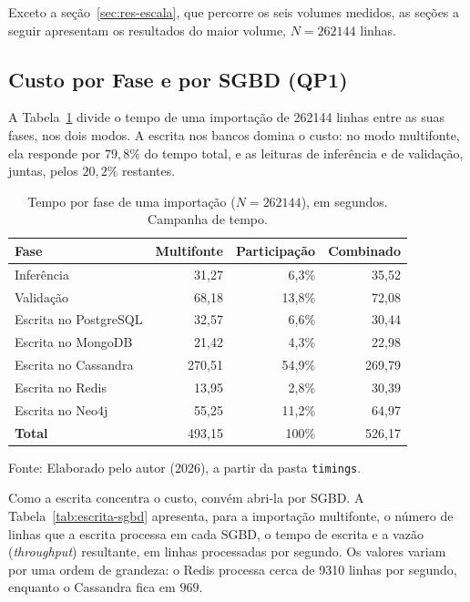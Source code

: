 Exceto a seção~\ref{sec:res-escala}, que percorre os seis volumes medidos, as seções a seguir
apresentam os resultados do maior volume, $N = \num{262144}$ linhas.

\subsection{Custo por Fase e por SGBD (QP1)}
\label{sec:res-fases}

A Tabela~\ref{tab:fases} divide o tempo de uma importação de \num{262144} linhas entre as
suas fases, nos dois modos. A escrita nos bancos domina o custo: no modo multifonte, ela
responde por $79{,}8\%$ do tempo total, e as leituras de inferência e de validação, juntas,
pelos $20{,}2\%$ restantes.

\begin{table}[H]
  \caption{Tempo por fase de uma importação ($N = \num{262144}$), em segundos. Campanha de tempo.}
  \label{tab:fases}
  \centering
  \begin{tabular}{l r r r}
    \toprule
    \textbf{Fase} & \textbf{Multifonte} & \textbf{Participação} & \textbf{Combinado} \\
    \midrule
    Inferência             &  31{,}27 &  6{,}3\% &  35{,}52 \\
    Validação              &  68{,}18 & 13{,}8\% &  72{,}08 \\
    Escrita no PostgreSQL  &  32{,}57 &  6{,}6\% &  30{,}44 \\
    Escrita no MongoDB     &  21{,}42 &  4{,}3\% &  22{,}98 \\
    Escrita no Cassandra   & 270{,}51 & 54{,}9\% & 269{,}79 \\
    Escrita no Redis       &  13{,}95 &  2{,}8\% &  30{,}39 \\
    Escrita no Neo4j       &  55{,}25 & 11{,}2\% &  64{,}97 \\
    \midrule
    \textbf{Total}         & 493{,}15 & 100\%    & 526{,}17 \\
    \bottomrule
  \end{tabular}
  \par\vspace{4pt}
  {\footnotesize Fonte: Elaborado pelo autor (2026), a partir da pasta \texttt{timings}.}
\end{table}

Como a escrita concentra o custo, convém abri-la por SGBD. A Tabela~\ref{tab:escrita-sgbd}
apresenta, para a importação multifonte, o número de linhas que a escrita processa em cada
SGBD, o tempo de escrita e a vazão (\textit{throughput}) resultante, em linhas processadas
por segundo. Os valores variam por uma ordem de grandeza: o Redis processa cerca de
\num{9310} linhas por segundo, enquanto o Cassandra fica em $969$.

